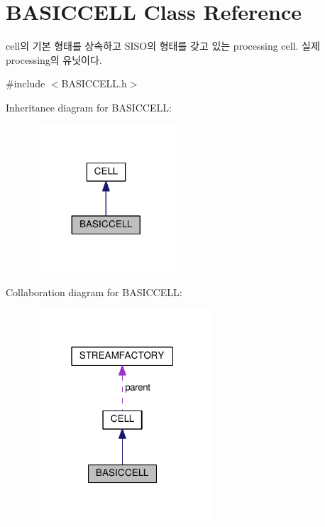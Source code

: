 \hypertarget{classBASICCELL}{}\section{B\+A\+S\+I\+C\+C\+E\+L\+L Class Reference}
\label{classBASICCELL}


cell의 기본 형태를 상속하고 S\+I\+S\+O의 형태를 갖고 있는 processing cell. 실제 processing의 유닛이다.  




{\ttfamily \#include $<$B\+A\+S\+I\+C\+C\+E\+L\+L.\+h$>$}



Inheritance diagram for B\+A\+S\+I\+C\+C\+E\+L\+L\+:\nopagebreak
\begin{figure}[H]
\begin{center}
\leavevmode
\includegraphics[width=152pt]{classBASICCELL__inherit__graph}
\end{center}
\end{figure}


Collaboration diagram for B\+A\+S\+I\+C\+C\+E\+L\+L\+:\nopagebreak
\begin{figure}[H]
\begin{center}
\leavevmode
\includegraphics[width=187pt]{classBASICCELL__coll__graph}
\end{center}
\end{figure}
